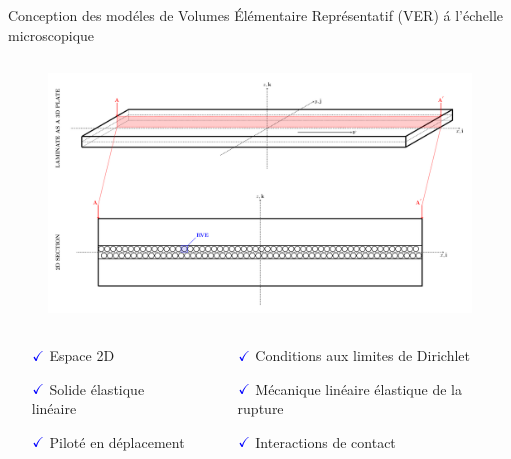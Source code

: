 \documentclass[final]{beamer}
\begin{document}
\begin{frame}
\begin{center}
\begin{minipage}{\textwidth}
\begin{exampleblock}{\rule[-0.6ex]{0pt}{50pt}\centering\LARGE Conception des mod\'eles de Volumes \'El\'ementaire Repr\'esentatif (VER) \'a l'\'echelle microscopique}
\begin{columns}
\begin{column}{0.3\textwidth}
\begin{center}
\begin{figure}[!h]
\centering
   \includegraphics[width=\columnwidth]{laminate-section.pdf}
\end{figure}
\begin{columns}
\begin{column}{0.4\columnwidth}
\begin{itemize}
\small
\item[$\color{blue}\checkmark$]Espace 2D
\item[$\color{blue}\checkmark$]Solide \'elastique lin\'eaire
\item[$\color{blue}\checkmark$]Pilot\'e en d\'eplacement
\end{itemize}
\end{column}
\begin{column}{0.6\columnwidth}
\begin{itemize}
\small
\item[$\color{blue}\checkmark$]Conditions aux limites de Dirichlet
\item[$\color{blue}\checkmark$]M\'ecanique lin\'eaire \'elastique de la rupture
\item[$\color{blue}\checkmark$]Interactions de contact
\end{itemize}
\end{column}
\end{columns}

\end{center}
\end{column}
\end{columns}
\end{exampleblock}
\end{minipage}
\end{center}
\end{frame}
\end{document}
